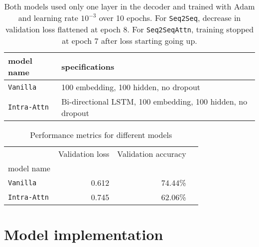 \documentclass[12pt]{article}
\begin{document}
\begin{landscape}
\begin{table}[tb]
    
    \centering
\begin{tabular}{ll}
\toprule
model name                   &specifications\\
\midrule
\texttt{Vanilla} & 100 embedding, 100 hidden, no dropout\\
\texttt{Intra-Attn} & Bi-directional LSTM, 100 embedding, 100 hidden, no dropout\\
\bottomrule
\end{tabular}
    \caption{Both models used only one layer in the decoder and trained with Adam and learning rate $10^{-3}$ over 10 epochs. For \texttt{Seq2Seq}, decrease in validation loss flattened at epoch 8. For \texttt{Seq2SeqAttn}, training stopped at epoch 7 after loss starting going up.}
    \label{tab:spec}
\end{table}
\begin{table}[h]
\centering
\begin{tabular}{lrrr}
\toprule
{}                                     & Validation loss & Validation accuracy \\
model name                             &       &        & \\
\midrule
\texttt{Vanilla}                      & 0.612  & 74.44\% \\
\texttt{Intra-Attn}  & 0.745   & 62.06\% \\
\bottomrule
\end{tabular}
\caption{Performance metrics for different models}
\label{table:performance}
\end{table}
\end{landscape}




\appendix
\section{Model implementation}
% 

\end{document}
